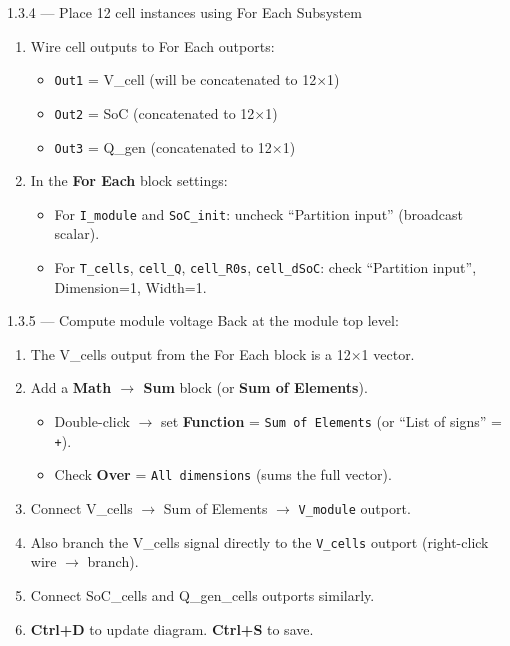 \documentclass[11pt,a4paper]{article}
\begin{document}
\begin{guistep}{1.3.4 — Place 12 cell instances using For Each Subsystem}
\begin{enumerate}
\begin{itemize}
    \end{itemize}
    \item Wire cell outputs to For Each outports:
    \begin{itemize}
        \item \texttt{Out1} = V\_cell (will be concatenated to 12$\times$1)
        \item \texttt{Out2} = SoC (concatenated to 12$\times$1)
        \item \texttt{Out3} = Q\_gen (concatenated to 12$\times$1)
    \end{itemize}
    \item In the \textbf{For Each} block settings:
    \begin{itemize}
        \item For \texttt{I\_module} and \texttt{SoC\_init}: uncheck ``Partition input'' (broadcast scalar).
        \item For \texttt{T\_cells}, \texttt{cell\_Q}, \texttt{cell\_R0s}, \texttt{cell\_dSoC}: check ``Partition input'', Dimension=1, Width=1.
    \end{itemize}
\end{enumerate}
\end{guistep}

\begin{guistep}{1.3.5 — Compute module voltage}
Back at the module top level:
\begin{enumerate}
    \item The V\_cells output from the For Each block is a 12$\times$1 vector.
    \item Add a \textbf{Math $\to$ Sum} block (or \textbf{Sum of Elements}).
    \begin{itemize}
        \item Double-click $\to$ set \textbf{Function} = \texttt{Sum of Elements} (or ``List of signs'' = \texttt{+}).
        \item Check \textbf{Over} = \texttt{All dimensions} (sums the full vector).
    \end{itemize}
    \item Connect V\_cells $\to$ Sum of Elements $\to$ \texttt{V\_module} outport.
    \item Also branch the V\_cells signal directly to the \texttt{V\_cells} outport (right-click wire $\to$ branch).
    \item Connect SoC\_cells and Q\_gen\_cells outports similarly.
    \item \textbf{Ctrl+D} to update diagram. \textbf{Ctrl+S} to save.
\end{enumerate}
\end{guistep}
\end{document}

